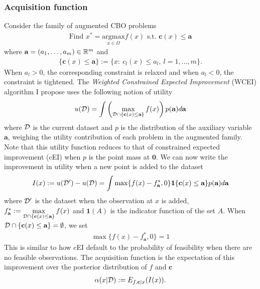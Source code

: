 \subsubsection{Acquisition function}
Consider the family of augmented CBO problems
\begin{align}
    \text{Find }x^*=\underset{x\in \Omega}{\text{argmax}}f(x)\text{ s.t. }\textbf{c}(x)\le \textbf{a}
\end{align}
where $\textbf{a} = (a_1,\ldots,a_m) \in \mathbb{R}^m$ and
\begin{align}
    \{\textbf{c}(x)\le \textbf{a}\} := \{x:\ c_l(x)\le a_l,\ l=1,\ldots,m\}.
\end{align}
When $a_l>0$, the corresponding constraint is relaxed and when $a_l<0$, the constraint is tightened. The \textit{Weighted Constrained Expected Improvement} (WCEI) algorithm I propose uses the following notion of utility
\begin{align}
    u(\mathcal{D}) = \int\left(\max\limits_{\mathcal{D} \cap \{\textbf{c}(x)\le \textbf{a}\}} f(x)\right)p(\textbf{a})d\textbf{a}
\end{align}
where $\mathcal{D}$ is the current dataset and $p$ is the distribution of the auxiliary variable $\textbf{a}$, weighing the utility contribution of each problem in the augmented family. Note that this utility function reduces to that of constrained expected improvement (cEI) \cite{gardner2014bayesian} when $p$ is the point mass at $\textbf{0}$. We can now write the improvement in utility when a new point is added to the dataset
\begin{align}\label{I(x)}
    I(x) := u(\mathcal{D}')-u(\mathcal{D}) = \int\max\{f(x)-f^*_\textbf{a},0\}\textbf{1}\{\textbf{c}(x)\le \textbf{a}\}p(\textbf{a})d\textbf{a}
\end{align}
where $\mathcal{D}'$ is the dataset when the observation at $x$ is added, $f^*_\textbf{a}:=\max\limits_{\mathcal{D} \cap \{\textbf{c}(x)\le \textbf{a}\}} f(x)$ and $\textbf{1}(A)$ is the indicator function of the set $A$. When $\mathcal{D} \cap \{\textbf{c}(x)\le \textbf{a}\}=\emptyset$, we set
\begin{align}
    \max\{f(x)-f^*_\textbf{a},0\} = 1
\end{align}
This is similar to how cEI default to the probability of feasibility when there are no feasible observations. The acquisition function is the expectation of this improvement over the posterior distribution of $f$ and $\textbf{c}$
\begin{align}\label{alpha(x)}
    \alpha(x|\mathcal{D}) := E_{f,\textbf{c}|x}(I(x)).
\end{align}

